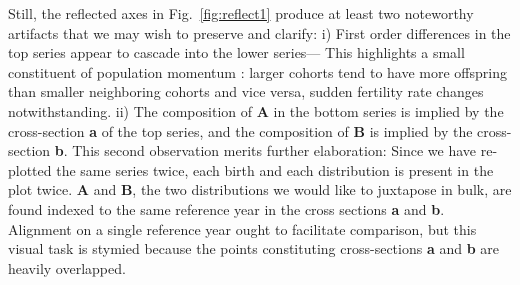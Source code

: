 Still, the reflected axes in Fig.~\ref{fig:reflect1} produce at least two noteworthy artifacts that we may wish to preserve and clarify: i) First order differences in the top series appear to cascade into the lower series--- This highlights a small constituent of population momentum \citep{keyfitz1971momentum}: larger cohorts tend to have more offspring than smaller neighboring cohorts and vice versa, sudden fertility rate changes notwithstanding. ii) The composition of \textbf{A} in the bottom series is implied by the cross-section \textbf{a} of the top series, and the composition of \textbf{B} is implied by the cross-section \textbf{b}. This second observation merits further elaboration: Since we have re-plotted the same series twice, each birth and each distribution is present in the plot twice. \textbf{A} and \textbf{B}, the two distributions we would like to juxtapose in bulk, are found indexed to the same reference year in the cross sections \textbf{a} and \textbf{b}. Alignment on a single reference year ought to facilitate comparison, but this visual task is stymied because the points constituting cross-sections \textbf{a} and \textbf{b} are heavily overlapped. 

